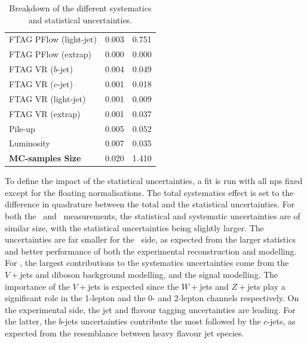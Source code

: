 \begin{table}[h!]
\begin{tabular}{l  C{2cm} C{2cm}}
        FTAG PFlow (light-jet)         &  0.003 & 0.751 \\
        FTAG PFlow (extrap)          &  0.000 & 0.000 \\
        FTAG VR ($b$-jet)            &  0.004 & 0.049 \\
        FTAG VR ($c$-jet)            &  0.001 & 0.018 \\
        FTAG VR (light-jet)            &  0.001 & 0.009 \\
        FTAG VR (extrap)             &  0.001 & 0.037 \\
        Pile-up                      &  0.005 & 0.052 \\
        Luminosity                   &  0.007 & 0.035 \\
        \hline
        \textbf{MC-samples Size}     &  0.020 & 1.410 \\
        \hline \hline
    \end{tabular}
    \caption{Breakdown of the different systematics and statistical uncertainties.}
    \label{tab:exp-breakdown}
\end{table}

To define the impact of the statistical uncertainties, a fit is run with all \glspl{np} fixed except for the floating normalisations. The total systematics effect is set to the difference in quadrature between the total and the statistical uncertainties. For both the \vhb\ and \vhc\ measurements, the statistical and systematic uncertainties are of similar size, with the statistical uncertainties being slightly larger. The uncertainties are far smaller for the \vhb\ side, as expected from the larger statistics and better performance of both the experimental reconstruction and modelling. For \vhb, the largest contributions to the systematics uncertainties come from the $V+$jets and diboson background modelling, and the signal modelling. The importance of the $V+$jets is expected since the $W+$jets and $Z+$jets play a significant role in the 1-lepton and the 0- and 2-lepton channels respectively. On the experimental side, the jet and flavour tagging uncertainties are leading. For the latter, the $b$-jets uncertainties contribute the most followed by the $c$-jets, as expected from the resemblance between heavy flavour jet species. \\

